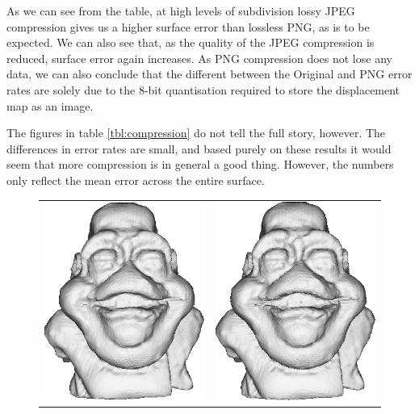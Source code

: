 As we can see from the table, at high levels of subdivision lossy JPEG compression gives us a higher surface error than lossless PNG, as is to be expected. We can also see that, as the quality of the JPEG compression is reduced, surface error again increases. As PNG compression does not lose any data, we can also conclude that the different between the Original and PNG error rates are solely due to the 8-bit quantisation required to store the displacement map as an image.

The figures in table \ref{tbl:compression} do not tell the full story, however. The differences in error rates are small, and based purely on these results it would seem that more compression is in general a good thing. However, the numbers only reflect the mean error across the entire surface. 

\begin{figure}
\begin{center}
\begin{tabular}{cc}
\includegraphics[width=6cm]{../images/compress_png} &
\includegraphics[width=6cm]{../images/compress_jpg95} \\

\end{tabular}
\end{center}
\end{figure}
